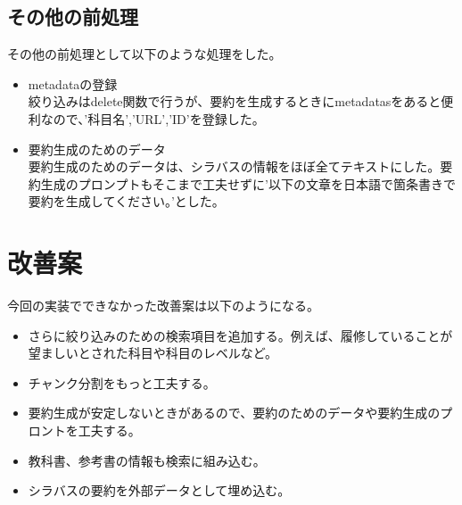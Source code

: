 \subsection{その他の前処理}
その他の前処理として以下のような処理をした。\\

\begin{itemize}
  \item metadataの登録\\
  絞り込みはdelete関数で行うが、要約を生成するときにmetadatasをあると便利なので、'科目名','URL','ID'を登録した。\\
  \item 要約生成のためのデータ\\
  要約生成のためのデータは、シラバスの情報をほぼ全てテキストにした。要約生成のプロンプトもそこまで工夫せずに'以下の文章を日本語で箇条書きで要約を生成してください。'とした。
\end{itemize}

\section{改善案}
今回の実装でできなかった改善案は以下のようになる。
\begin{itemize}
  \item さらに絞り込みのための検索項目を追加する。例えば、履修していることが望ましいとされた科目や科目のレベルなど。
  \item チャンク分割をもっと工夫する。
  \item 要約生成が安定しないときがあるので、要約のためのデータや要約生成のプロントを工夫する。
  \item 教科書、参考書の情報も検索に組み込む。
  \item シラバスの要約を外部データとして埋め込む。
\end{itemize}
% 
